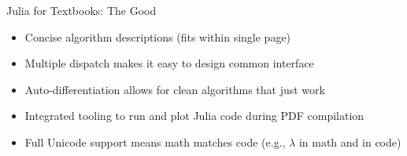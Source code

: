 \begin{frame}[fragile]{Julia for Textbooks: \textcolor{paloalto}{The Good}} \pause

\begin{itemize}
  \item \textcolor{paloalto}{Concise} algorithm descriptions (fits within single page) \pause
  \item \textcolor{paloalto}{Multiple dispatch} makes it easy to design common interface \pause
  \item \textcolor{paloalto}{Auto-differentiation} allows for clean algorithms that just work \pause
  \item \textcolor{paloalto}{Integrated tooling} to run and plot Julia code during PDF compilation \pause
  \item \textcolor{paloalto}{Full Unicode support} means math matches code (e.g., $\lambda$ in math and  in code)
\end{itemize}

\pause

\phantom{---}

\small
{}

\end{frame}